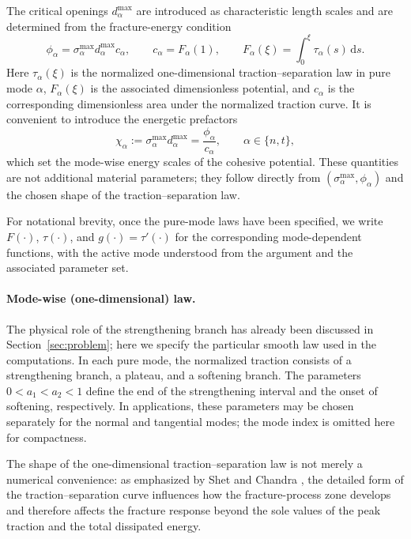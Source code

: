 \documentclass[smallextended]{svjour3}       %
\begin{document}
The critical openings \(d_{\alpha}^{\max}\) are introduced as characteristic
length scales and are determined from the fracture-energy condition
\begin{equation}
	\phi_{\alpha}
	=
	\sigma_{\alpha}^{\max} d_{\alpha}^{\max} c_{\alpha},
	\qquad
	c_{\alpha}=F_{\alpha}(1),
	\qquad
	F_{\alpha}(\xi)=\int_{0}^{\xi}\tau_{\alpha}(s)\,\mathrm{d}s.
	\label{eq:phi_energy}
\end{equation}
Here \(\tau_{\alpha}(\xi)\) is the normalized one-dimensional
traction--separation law in pure mode \(\alpha\),
\(F_{\alpha}(\xi)\) is the associated dimensionless potential, and
\(c_{\alpha}\) is the corresponding dimensionless area under the normalized
traction curve. It is convenient to introduce the energetic prefactors
\begin{equation}
	\chi_{\alpha}:=\sigma_{\alpha}^{\max}d_{\alpha}^{\max}
	=
	\frac{\phi_{\alpha}}{c_{\alpha}},
	\qquad
	\alpha\in\{n,t\},
	\label{eq:chi_def}
\end{equation}
which set the mode-wise energy scales of the cohesive potential. These
quantities are not additional material parameters; they follow directly from
\((\sigma_{\alpha}^{\max},\phi_{\alpha})\) and the chosen shape of the
traction--separation law.

For notational brevity, once the pure-mode laws have been specified, we write
\(F(\cdot)\), \(\tau(\cdot)\), and \(g(\cdot)=\tau'(\cdot)\) for the
corresponding mode-dependent functions, with the active mode understood from
the argument and the associated parameter set.

\paragraph{Mode-wise (one-dimensional) law.}
The physical role of the strengthening branch has already been discussed in
Section~\ref{sec:problem}; here we specify the particular smooth law used in
the computations. In each pure mode, the normalized traction consists of a
strengthening branch, a plateau, and a softening branch. The parameters
\(0<a_1<a_2<1\) define the end of the strengthening interval and the onset of
softening, respectively. In applications, these parameters may be chosen
separately for the normal and tangential modes; the mode index is omitted here
for compactness.

The shape of the one-dimensional traction--separation law is not merely a
numerical convenience: as emphasized by Shet and Chandra
\cite{ShetChandra2004}, the detailed form of the traction--separation curve
influences how the fracture-process zone develops and therefore affects the
fracture response beyond the sole values of the peak traction and the total
dissipated energy.
\end{document}
